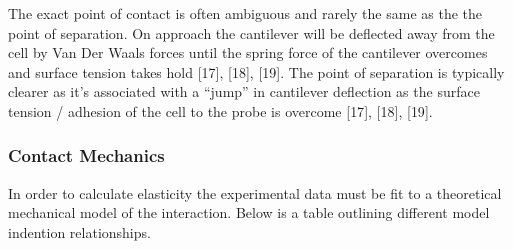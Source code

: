 \documentclass[
  paper=a4,
  ,captions=tableheading
]{scrartcl}
\begin{document}
The exact point of contact is often ambiguous and rarely the same as the
the point of separation. On approach the cantilever will be deflected
away from the cell by Van Der Waals forces until the spring force of the
cantilever overcomes and surface tension takes hold {[}17{]}, {[}18{]},
{[}19{]}. The point of separation is typically clearer as it's
associated with a ``jump'' in cantilever deflection as the surface
tension / adhesion of the cell to the probe is overcome {[}17{]},
{[}18{]}, {[}19{]}.

\subsubsection{Contact Mechanics}\label{contact-mechanics}

In order to calculate elasticity the experimental data must be fit to a
theoretical mechanical model of the interaction. Below is a table
outlining different model indention relationships.
\end{document}
